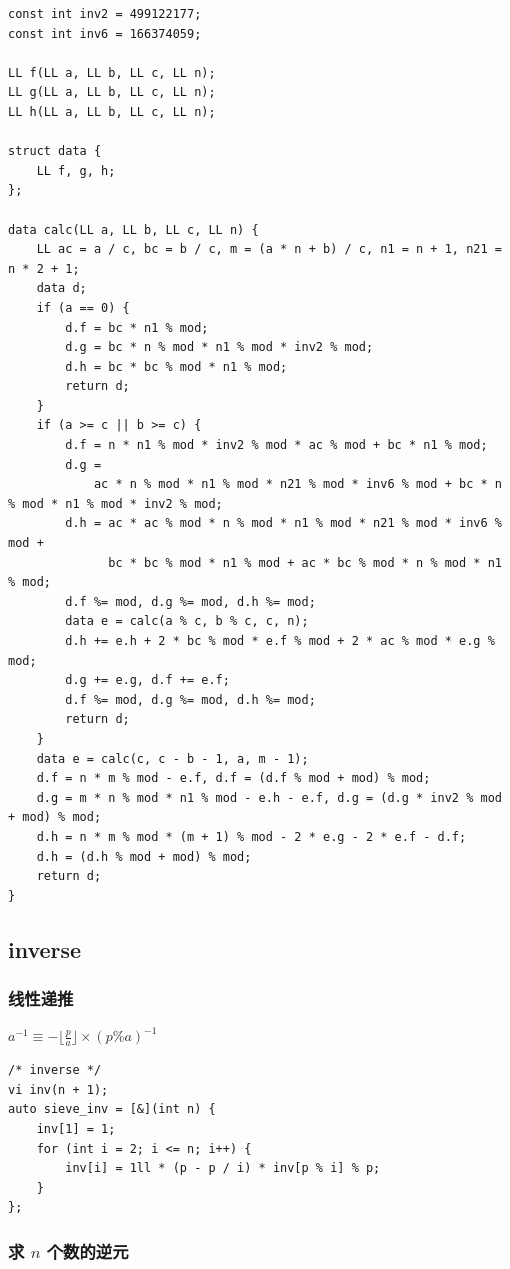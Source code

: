 \documentclass[UTF8, a4paper, titlepage, twoside]{ctexart}
\begin{document}
\begin{lstlisting}[style=cpp]
const int inv2 = 499122177;
const int inv6 = 166374059;

LL f(LL a, LL b, LL c, LL n);
LL g(LL a, LL b, LL c, LL n);
LL h(LL a, LL b, LL c, LL n);

struct data {
    LL f, g, h;
};

data calc(LL a, LL b, LL c, LL n) {
    LL ac = a / c, bc = b / c, m = (a * n + b) / c, n1 = n + 1, n21 = n * 2 + 1;
    data d;
    if (a == 0) {
        d.f = bc * n1 % mod;
        d.g = bc * n % mod * n1 % mod * inv2 % mod;
        d.h = bc * bc % mod * n1 % mod;
        return d;
    }
    if (a >= c || b >= c) {
        d.f = n * n1 % mod * inv2 % mod * ac % mod + bc * n1 % mod;
        d.g =
            ac * n % mod * n1 % mod * n21 % mod * inv6 % mod + bc * n % mod * n1 % mod * inv2 % mod;
        d.h = ac * ac % mod * n % mod * n1 % mod * n21 % mod * inv6 % mod +
              bc * bc % mod * n1 % mod + ac * bc % mod * n % mod * n1 % mod;
        d.f %= mod, d.g %= mod, d.h %= mod;
        data e = calc(a % c, b % c, c, n);
        d.h += e.h + 2 * bc % mod * e.f % mod + 2 * ac % mod * e.g % mod;
        d.g += e.g, d.f += e.f;
        d.f %= mod, d.g %= mod, d.h %= mod;
        return d;
    }
    data e = calc(c, c - b - 1, a, m - 1);
    d.f = n * m % mod - e.f, d.f = (d.f % mod + mod) % mod;
    d.g = m * n % mod * n1 % mod - e.h - e.f, d.g = (d.g * inv2 % mod + mod) % mod;
    d.h = n * m % mod * (m + 1) % mod - 2 * e.g - 2 * e.f - d.f;
    d.h = (d.h % mod + mod) % mod;
    return d;
}
\end{lstlisting}

\subsection{ inverse }
\subsubsection*{ 线性递推 }

$a^{-1} \equiv -\lfloor\frac{p}{a}\rfloor\times(p\%a)^{-1}$

\begin{lstlisting}[style=cpp]
/* inverse */
vi inv(n + 1);
auto sieve_inv = [&](int n) {
    inv[1] = 1;
    for (int i = 2; i <= n; i++) {
        inv[i] = 1ll * (p - p / i) * inv[p % i] % p;
    }
};
\end{lstlisting}

\subsubsection*{ 求 $n$ 个数的逆元 }
\end{document}
